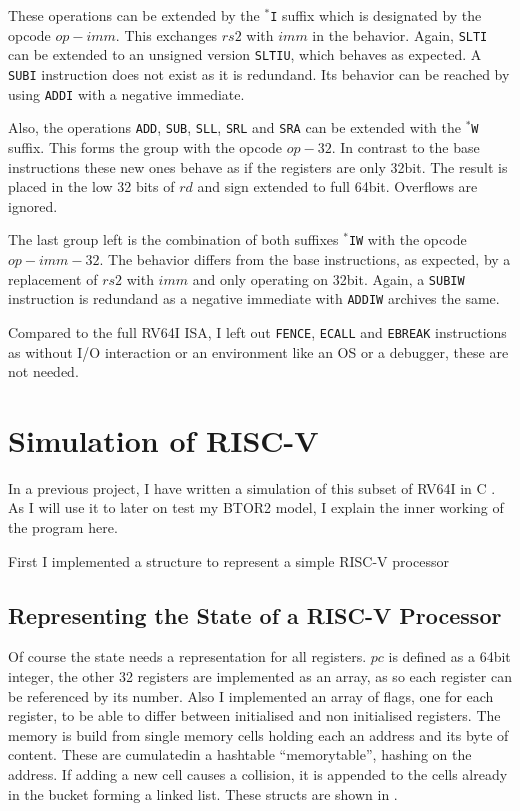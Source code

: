 These operations can be extended by the \texttt{$^*$I} suffix which
is designated by the opcode $op-imm$. This exchanges $rs2$ with $imm$
in the behavior. Again, \texttt{SLTI} can be extended to an unsigned
version \texttt{SLTIU}, which behaves as expected. A \texttt{SUBI}
instruction does not exist as it is redundand. Its behavior can be
reached by using \texttt{ADDI} with a negative immediate.

Also, the operations \texttt{ADD}, \texttt{SUB}, \texttt{SLL},
\texttt{SRL} and \texttt{SRA} can be extended with the \texttt{$^*$W}
suffix. This forms the group with the opcode $op-32$. In contrast to
the base instructions these new ones behave as if the registers are
only 32bit. The result is placed in the low 32 bits of $rd$ and sign
extended to full 64bit. Overflows are ignored.

The last group left is the combination of both suffixes
\texttt{$^*$IW} with the opcode $op-imm-32$. The behavior differs
from the base instructions, as expected, by a replacement of $rs2$
with $imm$ and only operating on 32bit. Again, a \texttt{SUBIW}
instruction is redundand as a negative immediate with \texttt{ADDIW}
archives the same.

Compared to the full RV64I ISA, I left out \texttt{FENCE},
\texttt{ECALL} and \texttt{EBREAK} instructions as without I/O
interaction or an environment like an OS or a debugger, these are not
needed.

\section{Simulation of RISC-V}\label{sec:simulation}
In a previous project, I have written a simulation of this subset of
RV64I in C \cite{repoSim}. As I will use it to later on test my BTOR2
model, I explain the inner working of the program here.

First I implemented a structure to represent a simple RISC-V
processor

\subsection{Representing the State of a RISC-V Processor}
Of course the state needs a representation for all registers. $pc$ is
defined as a 64bit integer, the other 32 registers are implemented as
an array, as so each register can be referenced by its number. Also I
implemented an array of flags, one for each register, to be able to
differ between initialised and non initialised registers. The memory
is build from single memory cells holding each an address and its
byte of content. These are cumulatedin a hashtable
\enquote{memorytable}, hashing on the address. If adding a new cell
causes a collision, it is appended to the cells already in the bucket
forming a linked list. These structs are shown in
.

